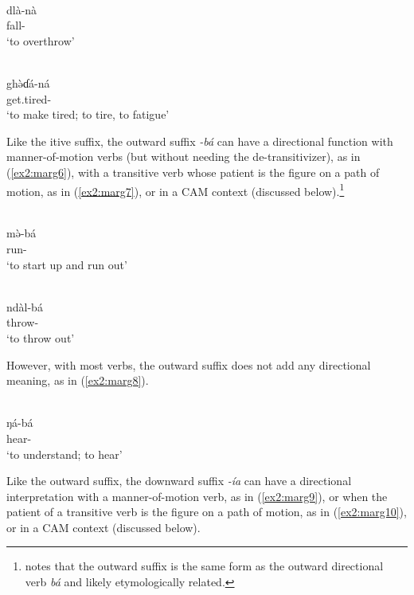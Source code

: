 \ea\label{ex2:marg4}
 \\
\gll dlà-nà	\\
fall-		\\
\glt `to overthrow'

\ex\label{ex2:marg5}
 \\
\gll ghə̀ɗá-ná	\\
get.tired-		\\
\glt `to make tired; to tire, to fatigue'
\z

Like the itive suffix, the outward suffix \textit{-bá} can have a directional function with manner-of-motion verbs (but without needing the de-transitivizer), as in (\ref{ex2:marg6}), with a transitive verb whose patient is the figure on a path of motion, as in (\ref{ex2:marg7}), or in a CAM context (discussed below).\footnote{\citet[125]{hoffmannGrammarMargiLanguage1963} notes that the outward suffix is the same form as the outward directional verb \textit{bá} and likely etymologically related.} 

\ea\label{ex2:marg6}
 \\
\gll mə̀-bá	\\
run-\\
\glt `to start up and run out'

\ex\label{ex2:marg7}
 \\
\gll ndàl-bá	\\
throw-	\\
\glt `to throw out'
\z

However, with most verbs, the outward suffix does not add any directional meaning, as in (\ref{ex2:marg8}).

\ea\label{ex2:marg8}
 \\
\gll ŋá-bá	\\
hear- \\
\glt `to understand; to hear'
\z

Like the outward suffix, the downward suffix \textit{-ía} can have a directional interpretation with a manner-of-motion verb, as in (\ref{ex2:marg9}), or when the patient of a transitive verb is the figure on a path of motion, as in (\ref{ex2:marg10}), or in a CAM context (discussed below). 

